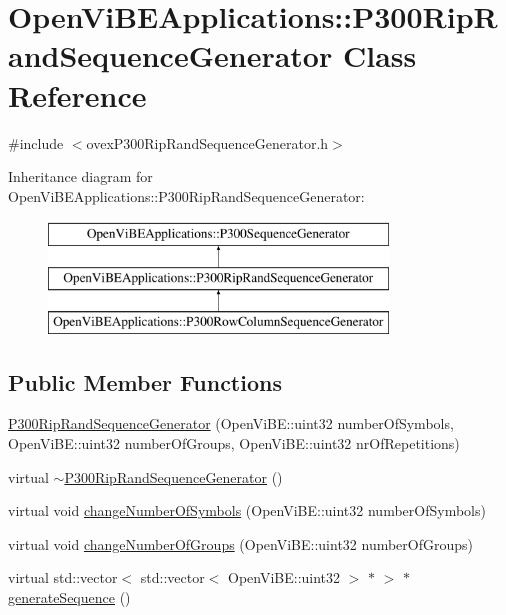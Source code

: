 \hypertarget{classOpenViBEApplications_1_1P300RipRandSequenceGenerator}{
\section{OpenViBEApplications::P300RipRandSequenceGenerator Class Reference}
\label{classOpenViBEApplications_1_1P300RipRandSequenceGenerator}
}


{\ttfamily \#include $<$ovexP300RipRandSequenceGenerator.h$>$}

Inheritance diagram for OpenViBEApplications::P300RipRandSequenceGenerator:\begin{figure}[H]
\begin{center}
\leavevmode
\includegraphics[height=3.000000cm]{classOpenViBEApplications_1_1P300RipRandSequenceGenerator}
\end{center}
\end{figure}
\subsection*{Public Member Functions}
\begin{DoxyCompactItemize}
\item 
\hyperlink{classOpenViBEApplications_1_1P300RipRandSequenceGenerator_a914f7f3f6b30ade8d1c54b384717eac2}{P300RipRandSequenceGenerator} (OpenViBE::uint32 numberOfSymbols, OpenViBE::uint32 numberOfGroups, OpenViBE::uint32 nrOfRepetitions)
\item 
virtual \hyperlink{classOpenViBEApplications_1_1P300RipRandSequenceGenerator_a9f37a7083d9b58fea35b52c3ea322dc6}{$\sim$P300RipRandSequenceGenerator} ()
\item 
virtual void \hyperlink{classOpenViBEApplications_1_1P300RipRandSequenceGenerator_a666993b80976acb68867fd76238e4e34}{changeNumberOfSymbols} (OpenViBE::uint32 numberOfSymbols)
\item 
virtual void \hyperlink{classOpenViBEApplications_1_1P300RipRandSequenceGenerator_a4d43617d54ee9301832baa766436f575}{changeNumberOfGroups} (OpenViBE::uint32 numberOfGroups)
\item 
virtual std::vector$<$ std::vector$<$ OpenViBE::uint32 $>$ $\ast$ $>$ $\ast$ \hyperlink{classOpenViBEApplications_1_1P300RipRandSequenceGenerator_ac4d8f5278614d29953921fb9ee752b90}{generateSequence} ()
\end{DoxyCompactItemize}
